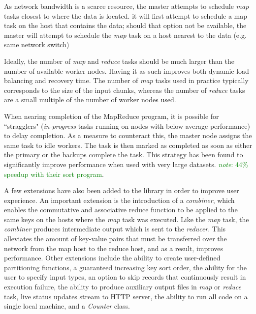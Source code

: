 \documentclass{report}
\newcommand{\note}[1]{\textcolor{green}{\textit{note}: #1}}
\begin{document}
        As network bandwidth is a scarce resource, the master attempts 
        to schedule \textit{map} tasks closest to where the data is 
        located. it will first attempt to schedule a map task on the host
        that contains the data; should that option not be available, the
        master will attempt to schedule the \textit{map} task on a host 
        nearest to the data (e.g. same network switch)

        Ideally, the number of \textit{map} and \textit{reduce} tasks 
        should be much larger than the number of available worker nodes. 
        Having it as such improves both dynamic load balancing and recovery 
        time. The number of \textit{map} tasks used in practice typically 
        corresponds to the size of the input chunks, whereas the number of 
        \textit{reduce} tasks are a small multiple of the number of worker 
        nodes used.

        When nearing completion of the MapReduce program, it is possible for
        ``stragglers" (\textit{in-progress} tasks running on nodes with below
        average performance) to delay completion. As a measure to counteract 
        this, the master node assigns the same task to idle workers. The task 
        is then marked as completed as soon as either the primary or the 
        backups complete the task. This strategy has been found to 
        significantly improve performance when used with very large datasets. 
        \note{44\% speedup with their sort program}.

        A few extensions have also been added to the library in order to 
        improve user experience. An important extension is the introduction 
        of a \textit{combiner}, which enables the commutative and associative 
        reduce function to be applied to the same keys on the hosts where the 
        \textit{map} task was executed. Like the \textit{map} task, the 
        \textit{combiner} produces intermediate output which is sent to the 
        \textit{reducer}. This alleviates the amount of key-value pairs that 
        must be transferred over the network from the map host to the reduce 
        host, and as a result, improves performance. Other extensions include 
        the ability to create user-defined partitioning functions, a guaranteed 
        increasing key sort order, the ability for the user to specify input 
        types, an option to skip records that continuously result in execution 
        failure, the ability to produce auxiliary output files in \textit{map} 
        or \textit{reduce} task, live status updates stream to HTTP server,
        the ability to run all code on a single local machine, and a 
        \textit{Counter} class.
\end{document}
